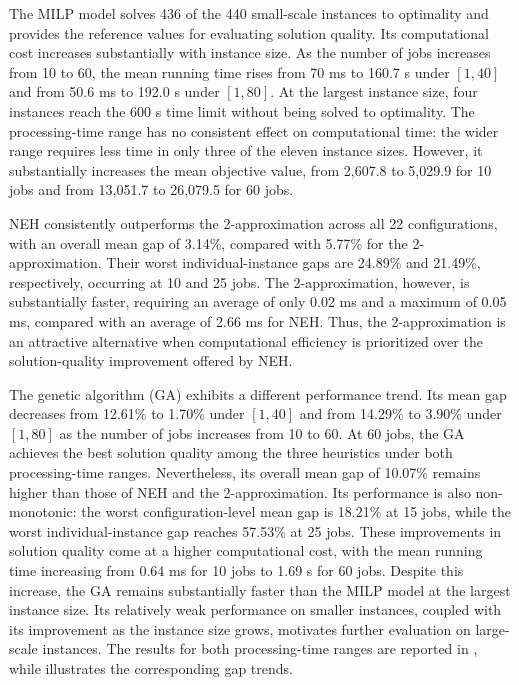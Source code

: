 \documentclass[12pt]{article}
\begin{document}
\begin{sloppypar}
        The MILP model solves 436 of the 440 small-scale instances to optimality
        and provides the reference values for evaluating solution quality.
        Its computational cost increases substantially with instance size.
        As the number of jobs increases from 10 to 60, the mean running time
        rises from 70 ms to 160.7 s under \([1,40]\) and from 50.6 ms to
        192.0 s under \([1,80]\). At the largest instance size, four instances
        reach the 600 s time limit without being solved to optimality.
        The processing-time range has no consistent effect on computational
        time: the wider range requires less time in only three of the eleven
        instance sizes. However, it substantially increases the mean objective
        value, from 2,607.8 to 5,029.9 for 10 jobs and from 13,051.7 to
        26,079.5 for 60 jobs.
        
        NEH consistently outperforms the 2-approximation across all 22
        configurations, with an overall mean gap of 3.14\%, compared with
        5.77\% for the 2-approximation. Their worst individual-instance gaps
        are 24.89\% and 21.49\%, respectively, occurring at 10 and 25 jobs.
        The 2-approximation, however, is substantially faster, requiring an
        average of only 0.02 ms and a maximum of 0.05 ms, compared with
        an average of 2.66 ms for NEH. Thus, the 2-approximation is an
        attractive alternative when computational efficiency is prioritized
        over the solution-quality improvement offered by NEH.
        
        The genetic algorithm (GA) exhibits a different performance trend.
        Its mean gap decreases from 12.61\% to 1.70\% under \([1,40]\) and
        from 14.29\% to 3.90\% under \([1,80]\) as the number of jobs increases
        from 10 to 60. At 60 jobs, the GA achieves the best solution quality
        among the three heuristics under both processing-time ranges.
        Nevertheless, its overall mean gap of 10.07\% remains higher than
        those of NEH and the 2-approximation. Its performance is also
        non-monotonic: the worst configuration-level mean gap is 18.21\%
        at 15 jobs, while the worst individual-instance gap reaches 57.53\%
        at 25 jobs. These improvements in solution quality come at a higher
        computational cost, with the mean running time increasing from
        0.64 ms for 10 jobs to 1.69 s for 60 jobs. Despite this increase,
        the GA remains substantially faster than the MILP model at the
        largest instance size. Its relatively weak performance on smaller
        instances, coupled with its improvement as the instance size grows,
        motivates further evaluation on large-scale instances. The results
        for both processing-time ranges are reported in
        , while
         illustrates the corresponding gap trends.
        

\end{sloppypar}
\end{document}
